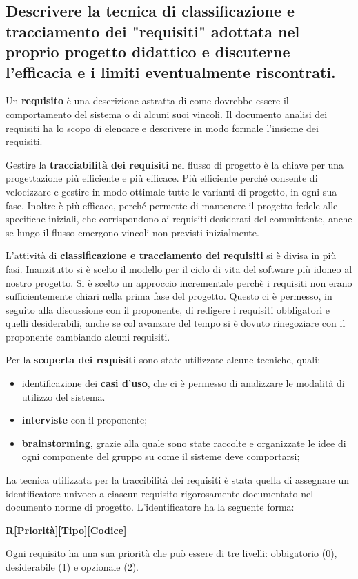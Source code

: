 \subsection{Descrivere la tecnica di classificazione e tracciamento dei "requisiti" adottata nel proprio progetto didattico e discuterne l'efficacia e i limiti eventualmente riscontrati.}

Un \textbf{requisito} è una descrizione astratta di come dovrebbe essere il comportamento del sistema o di alcuni suoi vincoli. Il documento analisi dei requisiti ha lo scopo di elencare e descrivere in modo formale l'insieme dei requisiti.

Gestire la \textbf{tracciabilità dei requisiti} nel flusso di progetto è la chiave per una progettazione più efficiente e più efficace.  Più efficiente perché consente di velocizzare e gestire in modo ottimale tutte le varianti di progetto, in ogni sua fase. Inoltre è più efficace, perché permette di mantenere il progetto fedele alle specifiche iniziali, che corrispondono ai requisiti desiderati del committente, anche se lungo il flusso emergono vincoli non previsti inizialmente.

L'attività di \textbf{classificazione e tracciamento dei requisiti} si è divisa in più fasi. Inanzitutto si è scelto il modello per il ciclo di vita del software più idoneo al nostro progetto. Si è scelto un approccio incrementale perchè i requisiti non erano sufficientemente chiari nella prima fase del progetto. Questo ci è permesso, in seguito alla discussione con il proponente, di redigere i requisiti obbligatori e quelli desiderabili, anche se col avanzare del tempo si è dovuto rinegoziare con il proponente cambiando alcuni requisiti.

Per la \textbf{scoperta dei requisiti} sono state utilizzate alcune tecniche, quali:
\begin{itemize}
\item identificazione dei \textbf{casi d'uso}, che ci è permesso di analizzare le modalità di utilizzo del sistema.
\item \textbf{interviste} con il proponente;
\item \textbf{brainstorming}, grazie alla quale sono state raccolte e organizzate le idee di ogni componente del gruppo su come il sisteme deve comportarsi;
\end{itemize}

La tecnica utilizzata per la traccibilità dei requisiti è stata quella di assegnare un identificatore univoco a ciascun requisito rigorosamente documentato nel documento norme di progetto. L'identificatore ha la seguente forma:
\begin{center}
\textbf{R[Priorità][Tipo][Codice]}
\end{center}
Ogni requisito ha una sua priorità che può essere di tre livelli: obbigatorio (0), desiderabile (1) e opzionale (2).

